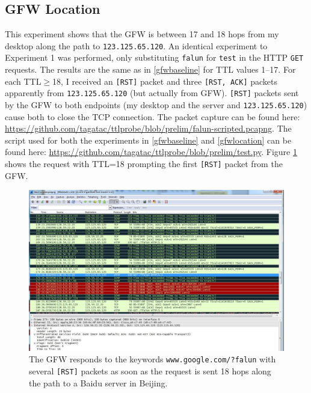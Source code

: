 \subsection{GFW Location}\label{gfwlocation}
This experiment shows that the GFW is between 17 and 18 hops from my desktop along the path to \texttt{123.125.65.120}.
An identical experiment to Experiment 1 was performed, only substituting \texttt{falun} for \texttt{test} in the HTTP \texttt{GET} requests.
The results are the same as in \autoref{gfwbaseline} for TTL values 1--17.
For each TTL$\geq$18, I received an \texttt{[RST]} packet and three \texttt{[RST, ACK]} packets apparently from \texttt{123.125.65.120} (but actually from GFW).
\texttt{[RST]} packets sent by the GFW to both endpoints (my desktop and the server and \texttt{123.125.65.120}) cause both to close the TCP connection.
The packet capture can be found here: \url{https://github.com/tagatac/ttlprobe/blob/prelim/falun-scripted.pcapng}.
The script used for both the experiments in \autoref{gfwbaseline} and \autoref{gfwlocation} can be found here: \url{https://github.com/tagatac/ttlprobe/blob/prelim/test.py}.
Figure \ref{fig_gfwfalun} shows the request with TTL=18 prompting the first \texttt{[RST]} packet from the GFW.
\begin{figure}
	\includegraphics[width=\textwidth]{figures/gfwfalun}
	\caption{The GFW responds to the keywords \texttt{www.google.com/?falun} with several \texttt{[RST]} packets as soon as the request is sent 18 hops along the path to a Baidu server in Beijing.}
	\label{fig_gfwfalun}
\end{figure}
